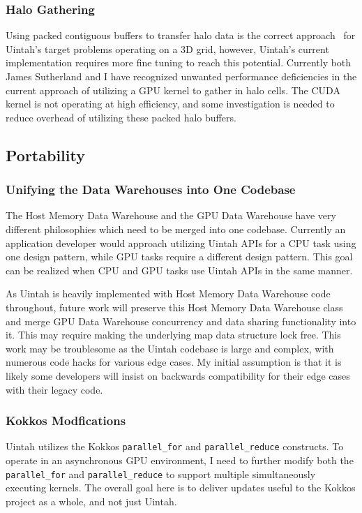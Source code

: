 \documentclass[12pt]{article}
\begin{document}
\subsubsection{Halo Gathering}
\label{ch:workplan-halo-gathering}
Using packed contiguous buffers to transfer halo data is the correct approach~\cite{ijpp16} for Uintah's target problems operating on a 3D grid, however, Uintah's current implementation requires more fine tuning to reach this potential. Currently both James Sutherland and I have recognized unwanted performance deficiencies in the current approach of utilizing a GPU kernel to gather in halo cells.   The CUDA kernel is not operating at high efficiency, and some investigation is needed to reduce overhead of utilizing these packed halo buffers. 

\subsection{Portability}
\label{ch:workplan-portability}
\subsubsection{Unifying the Data Warehouses into One Codebase}
\label{ch:workplan-unified-data-warehouse}
The Host Memory Data Warehouse and the GPU Data Warehouse have very different philosophies which need to be merged into one codebase.  Currently an application developer would approach utilizing Uintah APIs for a CPU task using one design pattern, while GPU tasks require a different design pattern.   This goal can be realized when CPU and GPU tasks use Uintah APIs in the same manner.  

As Uintah is heavily implemented with Host Memory Data Warehouse code throughout, future work will preserve this Host Memory Data Warehouse class and merge GPU Data Warehouse concurrency and data sharing functionality into it.  This may require making the underlying map data structure lock free.  This work may be troublesome as the Uintah codebase is large and complex, with numerous code hacks for various edge cases.  My initial assumption is that it is likely some developers will insist on backwards compatibility for their edge cases with their legacy code.

\subsubsection{Kokkos Modfications}
\label{ch:workplan-kokkos-modifications}
Uintah utilizes the Kokkos \texttt{parallel\_for} and \texttt{parallel\_reduce} constructs.  To operate in an asynchronous GPU environment, I need to further modify both the \texttt{parallel\_for} and \texttt{parallel\_reduce} to support multiple simultaneously executing kernels.   The overall goal here is to deliver updates useful to the Kokkos project as a whole, and not just Uintah. 
\end{document}
